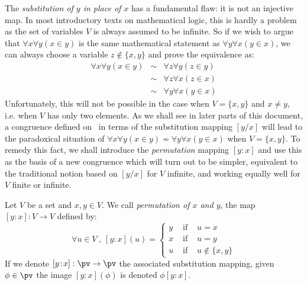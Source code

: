 The {\em substitution of $y$ in place of $x$} has a fundamental
flaw: it is not an injective map. In most introductory texts on
mathematical logic, this is hardly a problem as the set of variables
$V$ is always assumed to be infinite. So if we wish to argue that
$\forall x\forall y(x\in y)$ is the same mathematical statement as
$\forall y\forall x(y\in x)$, we can always choose a variable
$z\not\in\{x,y\}$ and prove the equivalence as:
    \begin{eqnarray*}
    \forall x\forall y(x\in y)&\sim&\forall z\forall y(z\in y)\\
    &\sim&\forall z\forall x(z\in x)\\
    &\sim&\forall y\forall x(y\in x)
    \end{eqnarray*}
Unfortunately, this will not be possible in the case when
$V=\{x,y\}$ and $x\neq y$, i.e. when $V$ has only two elements. As
we shall see in later parts of this document, a congruence defined
on \pv\ in terms of the substitution mapping $[y/x]$ will lead to
the paradoxical situation of $\forall x\forall y(x\in
y)\not\sim\forall y\forall x(y\in x)$ when $V=\{x,y\}$. To remedy
this fact, we shall introduce the {\em permutation} mapping
$[y\!:\!x]$ and use this as the basis of a new congruence which will
turn out to be simpler, equivalent to the traditional notion based
on $[y/x]$ for $V$ infinite, and working equally well for $V$ finite
or infinite. 
\begin{defin}\label{logic:def:single:var:permutation}
Let $V$ be a set and $x,y\in V$. We call {\em permutation of $x$ and
$y$}, the map $[y\!:\!x]:V\to V$ defined by:
    \[
    \forall u\in V\ ,\ [y\!:\!x](u)=\left\{
    \begin{array}{lcl}
    y&\mbox{\ if\ }&u=x\\
    x&\mbox{\ if\ }&u=y\\
    u&\mbox{\ if\ }&u\not\in\{x,y\}
    \end{array}
    \right.
    \]
If we denote $[y\!:\!x]:\pv\to\pv$ the associated substitution
mapping, given $\phi\in\pv$ the image $[y\!:\!x](\phi)$ is denoted
$\phi[y\!:\!x]$.
\end{defin}

